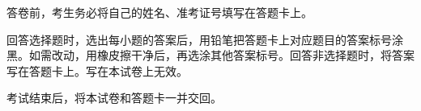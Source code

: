 \documentclass[a4paper,11pt]{report}
\begin{document}
\examfontsize



\noticetitle
\begin{examnotice}
\item 答卷前，考生务必将自己的姓名、准考证号填写在答题卡上。
\item 回答选择题时，选出每小题的答案后，用铅笔把答题卡上对应题目的答案标号涂黑。如需改动，用橡皮擦干净后，再选涂其他答案标号。回答非选择题时，将答案写在答题卡上。写在本试卷上无效。
\item 考试结束后，将本试卷和答题卡一并交回。
\end{examnotice}
\end{document}
